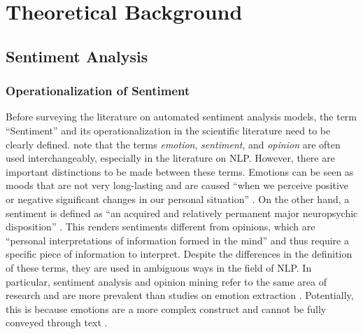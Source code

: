 \section{Theoretical Background}



\subsection{Sentiment Analysis}  %
\subsubsection{Operationalization of Sentiment}
Before surveying the literature on automated sentiment analysis models, the term ``Sentiment'' and its operationalization in the scientific literature need to be clearly defined.  note that the terms \emph{emotion}, \emph{sentiment}, and \emph{opinion} are often used interchangeably, especially in the literature on NLP. However, there are important distinctions to be made between these terms. Emotions can be seen as moods that are not very long-lasting and are caused ``when we perceive positive or negative significant changes in our personal situation'' . On the other hand, a sentiment is defined as ``an acquired and relatively permanent major neuropsychic disposition'' \cite[p.~16]{cattell1940sentiment}. This renders sentiments different from opinions, which are ``personal interpretations of information formed in the mind'' \cite[p.~4]{munezero2014they} and thus require a specific piece of information to interpret. %
Despite the differences in the definition of these terms, they are used in ambiguous ways in the field of NLP. In particular, sentiment analysis and opinion mining refer to the same area of research \cite{liu2012book} and are more prevalent than studies on emotion extraction . Potentially, this is because emotions are a more complex construct and cannot be fully conveyed through text .

